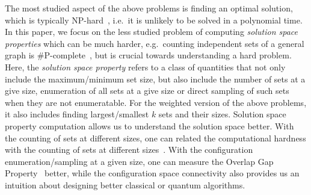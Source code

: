 \documentclass[onefignum, onetabnum]{siamart190516}
\newcommand{\<}{\langle}
\renewcommand{\>}{\rangle}
\newcommand{\blue}[1]{[{\bf  \color{blue}{JG: #1}}]}
\newcommand{\purple}[1]{[{\bf  \color{purple}{MC: #1}}]}
\newcounter{example}
\begin{document}
The most studied aspect of the above problems is finding an optimal solution, 
which is typically 
NP-hard~\cite{Hastad1996}, i.e.\ it is unlikely to be solved in a polynomial time.
In this paper, we focus on the less studied problem of computing \textit{solution space properties}  which can be much harder, e.g.\ counting independent sets of a general graph is \#P-complete~\cite{Vadhan2001}, but is crucial towards understanding a hard problem.
Here, the \textit{solution space property} refers to a class of quantities that not only include the maximum/minimum set size,
but also include the number of sets at a give size, enumeration of all sets at a give size or direct sampling of such sets when they are not enumeratable.
For the weighted version of the above problems, it also includes finding largest/smallest $k$ sets and their sizes.
Solution space property computation allows us to understand the solution space better.
With the counting of sets at different sizes, one can related the computational hardness with the counting of sets at different sizes~\cite{Xu2018}.
With the configuration enumeration/sampling at a given size, one can measure the Overlap Gap Property~\cite{Gamarnik2013, Gamarnik2019} better,
while the configuration space connectivity also provides us an intuition about designing better classical or quantum algorithms.
\end{document}
